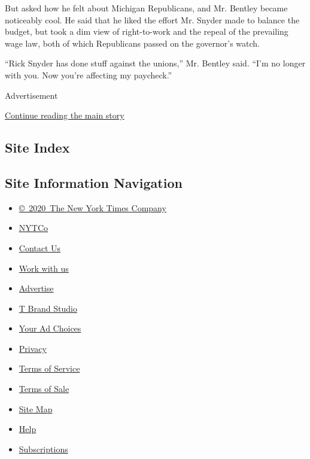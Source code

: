 But asked how he felt about Michigan Republicans, and Mr. Bentley became
noticeably cool. He said that he liked the effort Mr. Snyder made to
balance the budget, but took a dim view of right-to-work and the repeal
of the prevailing wage law, both of which Republicans passed on the
governor's watch.

``Rick Snyder has done stuff against the unions,'' Mr. Bentley said.
``I'm no longer with you. Now you're affecting my paycheck.''

Advertisement

\protect\hyperlink{after-bottom}{Continue reading the main story}

\hypertarget{site-index}{%
\subsection{Site Index}\label{site-index}}

\hypertarget{site-information-navigation}{%
\subsection{Site Information
Navigation}\label{site-information-navigation}}

\begin{itemize}
\tightlist
\item
  \href{https://help.nytimes.com/hc/en-us/articles/115014792127-Copyright-notice}{©~2020~The
  New York Times Company}
\end{itemize}

\begin{itemize}
\tightlist
\item
  \href{https://www.nytco.com/}{NYTCo}
\item
  \href{https://help.nytimes.com/hc/en-us/articles/115015385887-Contact-Us}{Contact
  Us}
\item
  \href{https://www.nytco.com/careers/}{Work with us}
\item
  \href{https://nytmediakit.com/}{Advertise}
\item
  \href{http://www.tbrandstudio.com/}{T Brand Studio}
\item
  \href{https://www.nytimes.com/privacy/cookie-policy\#how-do-i-manage-trackers}{Your
  Ad Choices}
\item
  \href{https://www.nytimes.com/privacy}{Privacy}
\item
  \href{https://help.nytimes.com/hc/en-us/articles/115014893428-Terms-of-service}{Terms
  of Service}
\item
  \href{https://help.nytimes.com/hc/en-us/articles/115014893968-Terms-of-sale}{Terms
  of Sale}
\item
  \href{https://spiderbites.nytimes.com}{Site Map}
\item
  \href{https://help.nytimes.com/hc/en-us}{Help}
\item
  \href{https://www.nytimes.com/subscription?campaignId=37WXW}{Subscriptions}
\end{itemize}
